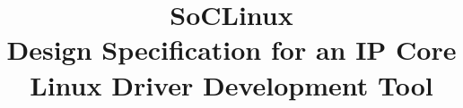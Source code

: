 %

\title{%
\Huge {\bf SoCLinux} \\
 \vspace*{3cm}
\Large {\bf Design Specification for an IP Core Linux Driver Development Tool} \\
}

